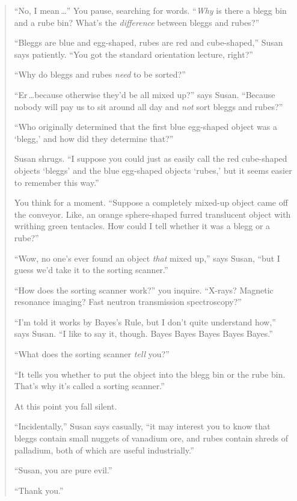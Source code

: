 {{\begin{quotation}
{
 ``No, I mean\,\ldots'' You pause,
searching for words. ``\textit{Why} is there a blegg
bin and a rube bin? What's the \textit{difference}
between bleggs and rubes?''}

{
 ``Bleggs are blue and egg-shaped, rubes are red
and cube-shaped,'' Susan says patiently.
``You got the standard orientation lecture,
right?''}

{
 ``Why do bleggs and rubes \textit{need} to be
sorted?''}

{
 ``Er\,\ldots because otherwise
they'd be all mixed up?'' says Susan.
``Because nobody will pay us to sit around all day and
\textit{not} sort bleggs and rubes?''}

{
 ``Who originally determined that the first blue
egg-shaped object was a `blegg,' and how
did they determine that?''}

{
 Susan shrugs. ``I suppose you could just as
easily call the red cube-shaped objects
`bleggs' and the blue egg-shaped objects
`rubes,' but it seems easier to remember
this way.''}

{
 You think for a moment. ``Suppose a completely
mixed-up object came off the conveyor. Like, an orange sphere-shaped
furred translucent object with writhing green tentacles. How could I
tell whether it was a blegg or a rube?''}

{
 ``Wow, no one's ever found an
object \textit{that} mixed up,'' says Susan,
``but I guess we'd take it to the
sorting scanner.''}

{
 ``How does the sorting scanner
work?'' you inquire. ``X-rays?
Magnetic resonance imaging? Fast neutron transmission
spectroscopy?''}

{
 ``I'm told it works by
Bayes's Rule, but I don't quite
understand how,'' says Susan. ``I
like to say it, though. Bayes Bayes Bayes Bayes
Bayes.''}

{
 ``What does the sorting scanner \textit{tell}
you?''}

{
 ``It tells you whether to put the object into the
blegg bin or the rube bin. That's why
it's called a sorting scanner.''}

{
 At this point you fall silent.}

{
 ``Incidentally,'' Susan says
casually, ``it may interest you to know that bleggs
contain small nuggets of vanadium ore, and rubes contain shreds of
palladium, both of which are useful industrially.''}

{
 ``Susan, you are pure evil.''}

{
  ``Thank you.''}
\end{quotation}

}}
